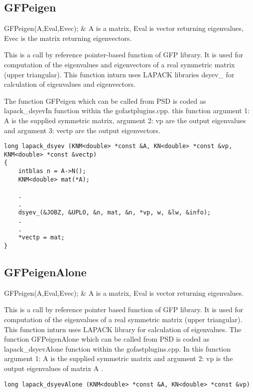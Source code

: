 \subsection{GFPeigen}

\begin{conditions*}
GFPeigen(A,Eval,Evec); & {\ttfamily A} is a matrix, {\ttfamily Eval} is vector returning eigenvalues, {\ttfamily Evec} is the matrix returning eigenvectors.
\end{conditions*}
This is a call by reference pointer-based function of GFP library. It is used for computation of the eigenvalues and eigenvectors of a real symmetric matrix (upper triangular). This function inturn uses LAPACK libraries {\ttfamily dsyev\_} for calculation of eigenvalues and eigenvectors. 

The function {\ttfamily GFPeigen} which can be called from PSD is coded as {\ttfamily lapack\_dsyevIn} function within the gofastplugins.cpp.  this function argument 1: {\ttfamily A} is the supplied symmetric matrix, argument 2: {\ttfamily vp}  are the output eigenvalues and argument 3: {\ttfamily vectp}  are the output eigenvectors.
\begin{lstlisting}[language=PSD]
long lapack_dsyev (KNM<double> *const &A, KN<double> *const &vp, KNM<double> *const &vectp) 
{
	intblas n = A->N();
	KNM<double> mat(*A);
	
    .
    .
    dsyev_(&JOBZ, &UPLO, &n, mat, &n, *vp, w, &lw, &info);
    .
    .
    *vectp = mat;
}
\end{lstlisting}


\subsection{GFPeigenAlone}

\begin{conditions*}
GFPeigen(A,Eval,Evec); & {\ttfamily A} is a matrix, {\ttfamily Eval} is vector returning eigenvalues.
\end{conditions*}

This is a call by reference pointer based function of GFP library. It is used for computation of the eigenvalues of a real symmetric matrix (upper triangular). This function inturn uses LAPACK library for calculation of eigenvalues. The function {\ttfamily GFPeigenAlone} which can be called from PSD is coded as {\ttfamily lapack\_dsyevAlone} function within the gofastplugins.cpp. In this function argument 1: {\ttfamily A} is the supplied symmetric matrix and argument 2: {\ttfamily vp}  is the output eigenvalues of matrix {\ttfamily A} .
\begin{lstlisting}[language=PSD]
long lapack_dsyevAlone (KNM<double> *const &A, KN<double> *const &vp)
\end{lstlisting}

